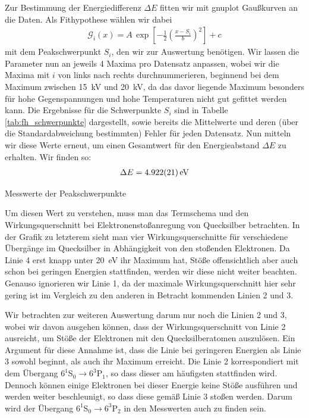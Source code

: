\documentclass[11pt, a4paper]{article}
\begin{document}
Zur Bestimmung der Energiedifferenz $\Delta E$ fitten wir mit gnuplot Gaußkurven an die Daten.
Als Fithypothese wählen wir dabei
\begin{align*}
\mathcal{G}_i(x)=A\,\exp\left[-\frac{1}{2}\left(\frac{x-S_i}{b}\right)^2\right] + c
\end{align*}
mit dem Peakschwerpunkt $S_i$, den wir zur Auswertung benötigen.
Wir lassen die Parameter nun an jeweils 4 Maxima pro Datensatz anpassen, wobei wir die Maxima mit $i$ von links nach rechts durchnummerieren, beginnend bei dem Maximum zwischen \SI{15}{\kilo\volt} und \SI{20}{\kilo\volt}, da das davor liegende Maximum besonders für hohe Gegenspannungen und hohe Temperaturen nicht gut gefittet werden kann.
Die Ergebnisse für die Schwerpunkte $S_i$ sind in Tabelle \ref{tab:fh_schwerpunkte} dargestellt, sowie bereits die Mittelwerte und deren (über die Standardabweichung bestimmten) Fehler für jeden Datensatz.
Nun mitteln wir diese Werte erneut, um einen Gesamtwert für den Energieabstand $\Delta E$ zu erhalten.
Wir finden so:
\begin{align*}
\Delta E = \SI{4.922+-0.021}{\electronvolt}
\end{align*}
\begin{table}[h]
\centering
\resizebox{\columnwidth}{!}{%
}
\caption{Messwerte der Peakschwerpunkte}
\label{tab:fh_schwerpunkte}
\end{table}
Um diesen Wert zu verstehen, muss man das Termschema und den Wirkungsquerschnitt bei Elektronenstoßanregung von Quecksilber betrachten.
In der Grafik zu letzterem sieht man vier Wirkungsquerschnitte für verschiedene Übergänge im Quecksilber in Abhängigkeit von den stoßenden Elektronen.
Da Linie 4 erst knapp unter \SI{20}{\electronvolt} ihr Maximum hat, Stöße offensichtlich aber auch schon bei geringen Energien stattfinden, werden wir diese nicht weiter beachten.
Genauso ignorieren wir Linie 1, da der maximale Wirkungsquerschnitt hier sehr gering ist im Vergleich zu den anderen in Betracht kommenden Linien 2 und 3.

Wir betrachten zur weiteren Auswertung darum nur noch die Linien 2 und 3, wobei wir davon ausgehen können, dass der Wirkungsquerschnitt von Linie 2 ausreicht, um Stöße der Elektronen mit den Quecksilberatomen auszulösen.
Ein Argument für diese Annahme ist, dass die Linie bei geringeren Energien als Linie 3 sowohl beginnt, als auch ihr Maximum erreicht.
Die Linie 2 korrespondiert mit dem Übergang $6^1$S$_0\rightarrow6^3$P$_1$, so dass dieser am häufigsten stattfinden wird.
Dennoch können einige Elektronen bei dieser Energie keine Stöße ausführen und werden weiter beschleunigt, so dass diese gemäß Linie 3 stoßen werden.
Darum wird der Übergang $6^1$S$_0\rightarrow6^3$P$_2$ in den Messwerten auch zu finden sein.
\end{document}
